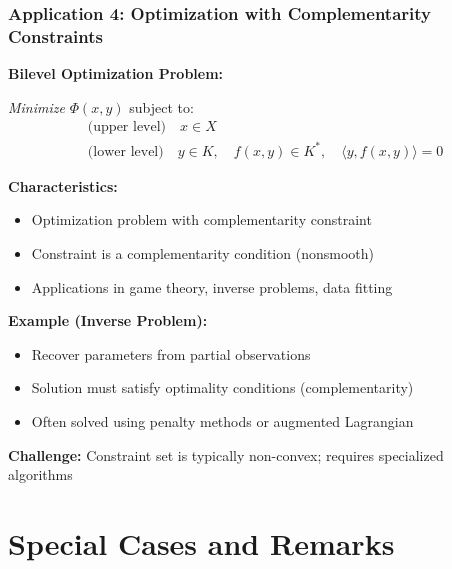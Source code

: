 \documentclass[aspectratio=169,10pt]{beamer}
\begin{document}
\begin{frame}
\frametitle{Application 4: Optimization with Complementarity Constraints}

\textbf{Bilevel Optimization Problem:}

\textit{Minimize} $\Phi(x, y)$ subject to:
\begin{align*}
&\text{(upper level)} \quad x \in X\\
&\text{(lower level)} \quad y \in K, \quad f(x,y) \in K^*, \quad \langle y, f(x,y) \rangle = 0
\end{align*}

\vspace{0.3cm}

\textbf{Characteristics:}
\begin{itemize}
    \item Optimization problem with complementarity constraint
    \item Constraint is a complementarity condition (nonsmooth)
    \item Applications in game theory, inverse problems, data fitting
\end{itemize}

\vspace{0.3cm}

\textbf{Example (Inverse Problem):}
\begin{itemize}
    \item Recover parameters from partial observations
    \item Solution must satisfy optimality conditions (complementarity)
    \item Often solved using penalty methods or augmented Lagrangian
\end{itemize}

\vspace{0.3cm}

\textbf{Challenge:} Constraint set is typically non-convex; requires specialized algorithms

\end{frame}

\section{Special Cases and Remarks}
\end{document}
